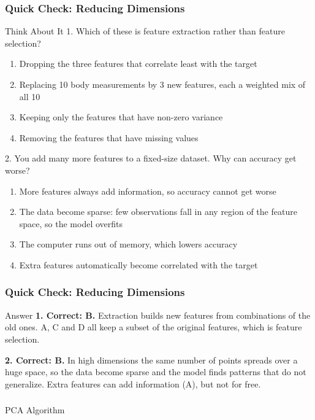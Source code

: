 \begin{frame}[fragile]\frametitle{Quick Check: Reducing Dimensions}
\begin{block}{Think About It}
1. Which of these is feature extraction rather than feature selection?
\begin{enumerate}
  \item[A.] Dropping the three features that correlate least with the target
  \item[B.] Replacing 10 body measurements by 3 new features, each a weighted mix of all 10
  \item[C.] Keeping only the features that have non-zero variance
  \item[D.] Removing the features that have missing values
\end{enumerate}
2. You add many more features to a fixed-size dataset. Why can accuracy get worse?
\begin{enumerate}
  \item[A.] More features always add information, so accuracy cannot get worse
  \item[B.] The data become sparse: few observations fall in any region of the feature space, so the model overfits
  \item[C.] The computer runs out of memory, which lowers accuracy
  \item[D.] Extra features automatically become correlated with the target
\end{enumerate}
\end{block}
\end{frame}

\begin{frame}[fragile]\frametitle{Quick Check: Reducing Dimensions}
\begin{block}{Answer}
\textbf{1. Correct: B.} Extraction builds new features from combinations of the old ones. A, C and D all keep a subset of the original features, which is feature selection.

\textbf{2. Correct: B.} In high dimensions the same number of points spreads over a huge space, so the data become sparse and the model finds patterns that do not generalize. Extra features can add information (A), but not for free.
\end{block}
\end{frame}

\begin{frame}[fragile]\frametitle{}
\begin{center}
{\Large PCA Algorithm}
\end{center}
\end{frame}


